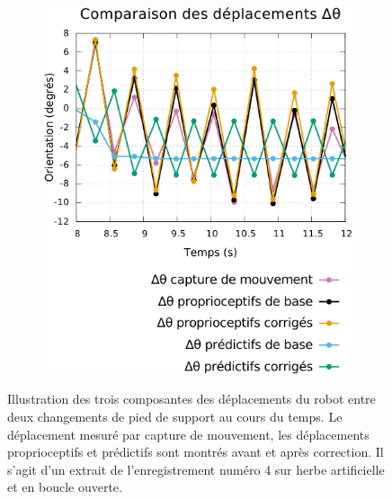 \begin{figure}[htbp]
\begin{subfigure}{0.29\paperwidth}
    \end{subfigure}
    \begin{subfigure}{0.29\paperwidth}
        \centering
        \includegraphics[type=pdf,ext=.pdf,read=.pdf,width=1.0\linewidth]{../plot/OdometryLWPR/grass_open_traj1_diff_yaw}
    \end{subfigure}
    \caption{\label{fig:odometry_lwpr_diff} 
        Illustration des trois composantes des déplacements du robot 
        entre deux changements de pied de support au cours du temps.
        Le déplacement mesuré par capture de mouvement, les déplacements 
        proprioceptifs et prédictifs sont montrés avant et après correction.
        Il s'agit d'un extrait de l'enregistrement numéro 4 
        sur herbe artificielle et en boucle ouverte.
    }
\end{figure}

